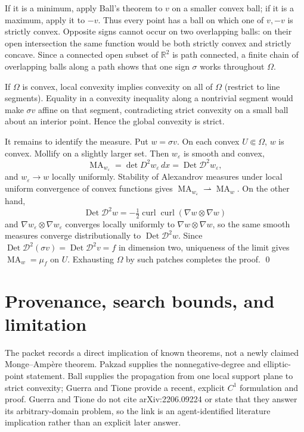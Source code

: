 \documentclass[11pt]{article}
\newcommand{\RR}{\mathbb R}
\newcommand{\Detw}{\operatorname{Det}\mathcal D^2}
\newcommand{\MA}{\operatorname{MA}}
\begin{document}
If it is a minimum, apply Ball's theorem to $v$ on a smaller convex ball; if
it is a maximum, apply it to $-v$.  Thus every point has a ball on which one
of $v,-v$ is strictly convex.  Opposite signs cannot occur on two
overlapping balls: on their open intersection the same function would be
both strictly convex and strictly concave.  Since a connected open subset of
$\RR^2$ is path connected, a finite chain of overlapping balls along a path
shows that one sign $\sigma$ works throughout $\Omega$.

If $\Omega$ is convex, local convexity implies convexity on all of $\Omega$
(restrict to line segments).  Equality in a convexity inequality along a
nontrivial segment would make $\sigma v$ affine on that segment, contradicting
strict convexity on a small ball about an interior point.  Hence the global
convexity is strict.

It remains to identify the measure.  Put $w=\sigma v$.  On each convex
$U\Subset\Omega$, $w$ is convex.  Mollify on a slightly larger set.  Then
$w_\varepsilon$ is smooth and convex,
\[
 \MA_{w_\varepsilon}
   =\det D^2w_\varepsilon\,dx
   =\Detw w_\varepsilon,
\]
and $w_\varepsilon\to w$ locally uniformly.  Stability of Alexandrov
measures under local uniform convergence of convex functions gives
$\MA_{w_\varepsilon}\rightharpoonup\MA_w$.  On the other hand,
\[
 \Detw w=-\tfrac12\operatorname{curl}\operatorname{curl}
       (\nabla w\otimes\nabla w)
\]
and $\nabla w_\varepsilon\otimes\nabla w_\varepsilon$ converges locally
uniformly to $\nabla w\otimes\nabla w$, so the same smooth measures converge
distributionally to $\Detw w$.  Since
$\Detw(\sigma v)=\Detw v=f$ in dimension two, uniqueness of the limit gives
$\MA_w=\mu_f$ on $U$.  Exhausting $\Omega$ by such patches completes the
proof. \qed

\section*{Provenance, search bounds, and limitation}

The packet records a direct implication of known theorems, not a newly
claimed Monge--Amp\`ere theorem.  Pakzad supplies the nonnegative-degree and
elliptic-point statement.  Ball supplies the propagation from one local
support plane to strict convexity; Guerra and Tione provide a recent,
explicit $C^1$ formulation and proof.  Guerra and Tione do not cite
arXiv:2206.09224 or state that they answer its arbitrary-domain problem, so
the link is an agent-identified literature implication rather than an
explicit later answer.
\end{document}
